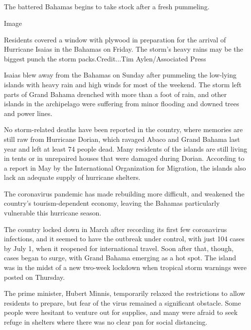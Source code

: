 \hypertarget{-6}{%
\subsection{}\label{-6}}

The battered Bahamas begins to take stock after a fresh pummeling.

Image

Residents covered a window with plywood in preparation for the arrival
of Hurricane Isaias in the Bahamas on Friday. The storm's heavy rains
may be the biggest punch the storm packs.Credit...Tim Aylen/Associated
Press

Isaias blew away from the Bahamas on Sunday after pummeling the
low-lying islands with heavy rain and high winds for most of the
weekend. The storm left parts of Grand Bahama drenched with more than a
foot of rain, and other islands in the archipelago were suffering from
minor flooding and downed trees and power lines.

No storm-related deaths have been reported in the country, where
memories are still raw from Hurricane Dorian, which ravaged Abaco and
Grand Bahama last year and left at least 74 people dead. Many residents
of the islands are still living in tents or in unrepaired houses that
were damaged during Dorian. According to a report in May by the
International Organization for Migration, the islands also lack an
adequate supply of hurricane shelters.

The coronavirus pandemic has made rebuilding more difficult, and
weakened the country's tourism-dependent economy, leaving the Bahamas
particularly vulnerable this hurricane season.

The country locked down in March after recording its first few
coronavirus infections, and it seemed to have the outbreak under
control, with just 104 cases by July 1, when it reopened for
international travel. Soon after that, though, cases began to surge,
with Grand Bahama emerging as a hot spot. The island was in the midst of
a new two-week lockdown when tropical storm warnings were posted on
Thursday.

The prime minister, Hubert Minnis, temporarily relaxed the restrictions
to allow residents to prepare, but fear of the virus remained a
significant obstacle. Some people were hesitant to venture out for
supplies, and many were afraid to seek refuge in shelters where there
was no clear pan for social distancing.

\hypertarget{-7}{%
\subsection{}\label{-7}}

